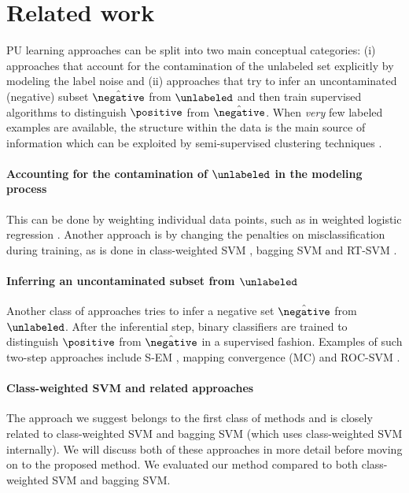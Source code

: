 
\section{Related work}
PU learning approaches can be split into two main conceptual categories: (i) approaches that account for the contamination of the unlabeled set explicitly by modeling the label noise and (ii) approaches that try to infer an uncontaminated (negative) subset $\hat{\negative}$ from $\unlabeled$ and then train supervised algorithms to distinguish $\positive$ from $\hat{\negative}$. When \emph{very} few labeled examples are available, the structure within the data is the main source of information which can be exploited by semi-supervised clustering techniques \citep{bksc2}. 

\paragraph{Accounting for the contamination of $\unlabeled$ in the modeling process}
This can be done by weighting individual data points, such as in weighted logistic regression \citep{Elkan:2008:LCO:1401890.1401920,Lee03learningwith}. Another approach is by changing the penalties on misclassification during training, as is done in class-weighted SVM \citep{Liu:2003:BTC:951949.952139}, bagging SVM \citep{mordelet2014bagging} and RT-SVM \citep{Liu:2005:PSC:2138033.2138052}. 

\paragraph{Inferring an uncontaminated subset from $\unlabeled$}
Another class of approaches tries to infer a negative set $\hat{\negative}$ from $\unlabeled$. After the inferential step, binary classifiers are trained to distinguish $\positive$ from $\hat{\negative}$ in a supervised fashion. Examples of such two-step approaches include S-EM \citep{liu02partially}, mapping convergence (MC) \citep{Yu:2005:SCM:1108759.1108762} and ROC-SVM \citep{Li03learningto}.

\paragraph{Class-weighted SVM and related approaches} The approach we suggest belongs to the first class of methods and is closely related to class-weighted SVM and bagging SVM (which uses class-weighted SVM internally). We will discuss both of these approaches in more detail before moving on to the proposed method. We evaluated our method compared to both class-weighted SVM and bagging SVM.


